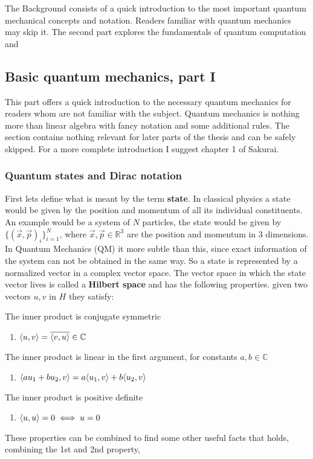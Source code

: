 The Background consists of a quick introduction to the most important quantum mechanical concepts and notation. Readers familiar with quantum mechanics may skip it. The second part explores the fundamentals of quantum computation and 

\subsection{Basic quantum mechanics, part I}
This part offers a quick introduction to the necessary quantum mechanics for readers whom are not familiar with the subject. Quantum mechanics is nothing more than linear algebra with fancy notation and some additional rules. The section contains nothing relevant for later parts of the thesis and can be safely skipped. For a more complete introduction I suggest chapter 1 of Sakurai.


\subsubsection{Quantum states and Dirac notation}
First lets define what is meant by the term \textbf{state}. In classical physics a state would be given by the position and momentum of all its individual constituents. An example would be a system of $N$ particles, the state would be given by $\{ (\vec{x}, \vec{p})_i \}_{i=1}^N$, where $\vec{x},\vec{p} \in \mathbb{R}^3$ are the position and momentum in 3 dimensions. In Quantum Mechanics (QM) it more subtle than this, since exact information of the system can not be obtained in the same way. So a state is represented by a normalized vector in a complex vector space. The vector space in which the state vector lives is called a \textbf{Hilbert space} and has the following properties. given two vectors $u,v$ in $H$ they satisfy:

\noindent The inner product is conjugate symmetric
\begin{enumerate}
\item $\langle u,v \rangle = \overline{\langle v,u \rangle} \in \mathbb{C}$
\end{enumerate}
The inner product is linear in the first argument, for constants $a,b\in \mathbb{C}$
\begin{enumerate}[resume]
\item $\langle au_1 + bu_2,v \rangle = a\langle u_1,v \rangle + b\langle u_2,v \rangle$
\end{enumerate}
The inner product is positive definite 
\begin{enumerate}[resume]
\item $\langle u,u \rangle = 0 \iff u = 0$
\end{enumerate}
These properties can be combined to find some other useful facts that holds,
combining the 1st and 2nd property,

